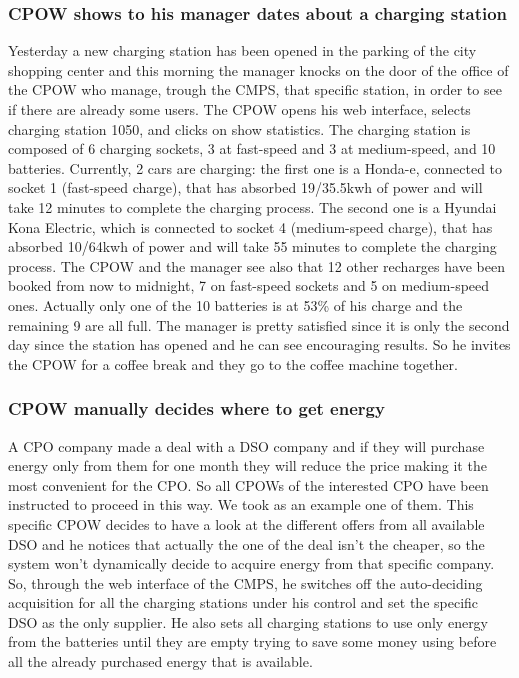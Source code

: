 \documentclass[a4paper]{report}
\begin{document}
\subsubsection{CPOW shows to his manager dates about a charging station}
Yesterday a new charging station has been opened in the parking of the city shopping center and this morning the manager knocks on the door of the office of the CPOW who manage, trough the CMPS, that specific station, in order to see if there are already some users. The CPOW opens his web interface, selects charging station 1050, and clicks on show statistics. The charging station is composed of 6 charging sockets, 3 at fast-speed and 3 at medium-speed, and 10 batteries. Currently, 2 cars are charging: the first one is a Honda-e, connected to socket 1 (fast-speed charge), that has absorbed 19/35.5kwh of power and will take 12 minutes to complete the charging process. The second one is a Hyundai	Kona Electric, which is connected to socket 4 (medium-speed charge), that has absorbed 10/64kwh of power and will take 55 minutes to complete the charging process. The CPOW and the manager see also that 12 other recharges have been booked from now to midnight, 7 on fast-speed sockets and 5 on medium-speed ones. Actually only one of the 10 batteries is at 53\% of his charge and the remaining 9 are all full. The manager is pretty satisfied since it is only the second day since the station has opened and he can see encouraging results. So he invites the CPOW for a coffee break and they go to the coffee machine together.

\subsubsection{CPOW manually decides where to get energy}
A CPO company made a deal with a DSO company and if they will purchase energy only from them for one month they will reduce the price making it the most convenient for the CPO. So all CPOWs of the interested CPO have been instructed to proceed in this way. We took as an example one of them. This specific CPOW decides to have a look at the different offers from all available DSO and he notices that actually the one of the deal isn't the cheaper, so the system won't dynamically decide to acquire energy from that specific company. So, through the web interface of the CMPS, he switches off the auto-deciding acquisition for all the charging stations under his control and set the specific DSO as the only supplier. He also sets all charging stations to use only energy from the batteries until they are empty trying to save some money using before all the already purchased energy that is available.
\end{document}
